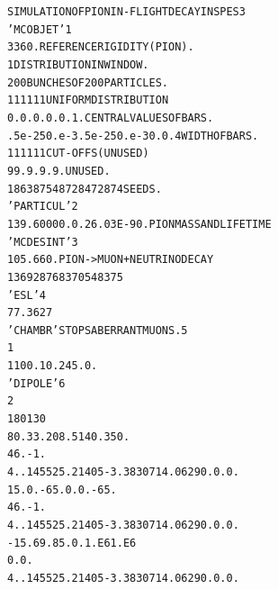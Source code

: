 \footnotesize
\begin{alltt}
  SIMULATION  OF  PION  IN-FLIGHT  DECAY  IN  SPES3                             
  'MCOBJET'                                                              1      
  3360.                                REFERENCE  RIGIDITY (PION).              
  1                                    DISTRIBUTION  IN  WINDOW.                
  200                                  BUNCHES  OF  200  PARTICLES.             
  1     1       1     1      1    1    UNIFORM DISTRIBUTION                     
  0.    0.      0.    0.     0.   1.   CENTRAL  VALUES  OF  BARS.               
  .5e-2 50.e-3 .5e-2  50.e-3 0.  0.4   WIDTH  OF  BARS.                         
  1     1       1     1      1    1    CUT-OFFS (UNUSED)                        
  9   9. 9. 9. 9.                      UNUSED.                                  
  186387 548728 472874                 SEEDS.                                   
  'PARTICUL'                                                             2      
  139.6000 0. 0. 26.03E-9 0.           PION MASS AND LIFE TIME                  
  'MCDESINT'                                                             3      
  105.66   0.                          PION -> MUON + NEUTRINODECAY             
  136928 768370 548375                                                          
  'ESL'                                                                  4      
  77.3627                                                                       
  'CHAMBR'                             STOPS  ABERRANT  MUONS.           5      
  1                                                                             
  1   100. 10. 245.  0.                                                         
  'DIPOLE'                                                               6      
  2
  180  130                                                                      
  80.   33.     208.5  140.  350.                                               
  46. -1.                                                                       
  4. .14552 5.21405 -3.38307 14.0629 0. 0. 0.                                   
   15.   0.      -65.  0.    0.  -65.                                           
  46. -1.                                                                       
  4. .14552 5.21405 -3.38307 14.0629 0. 0. 0.                                   
  -15.  69.       85.  0.    1.E6  1.E6                                         
  0. 0.
  4. .14552 5.21405 -3.38307 14.0629 0. 0. 0.                                   

\end{alltt}
